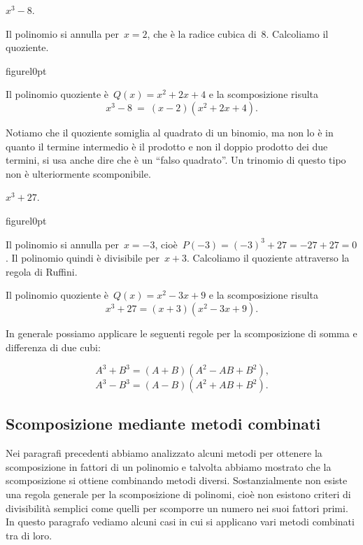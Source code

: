 \begin{exrig}
 \begin{esempio}
 $x^{3}-8$.
\end{esempio}
Il polinomio si annulla per~$x=2$, che è la radice cubica di~8.
Calcoliamo il quoziente.
\begin{wrapfloat}{figure}{l}{0pt}
 
\end{wrapfloat}
Il polinomio quoziente è~$Q(x)=x^{2}+2x+4$ e la scomposizione risulta
\[x^{3}-8\ =\ (x-2)(x^{2}+2x+4).\]

Notiamo che il quoziente somiglia al quadrato di un binomio, ma non lo
è in quanto il termine intermedio è il prodotto e non il doppio
prodotto dei due termini, si usa anche dire che è un ``falso quadrato''.
Un trinomio di questo tipo non è ulteriormente scomponibile.


 \begin{esempio}
 $x^{3}+27$.
 \end{esempio}
 \begin{wrapfloat}{figure}{l}{0pt}
 
\end{wrapfloat}
Il polinomio si annulla per~$x=-3$, cioè~$P(-3)=(-3)^{3}+27=-27+27=0$.
Il polinomio quindi è divisibile per~$x+3$. Calcoliamo il quoziente
attraverso la regola di Ruffini.

Il polinomio quoziente è~$Q(x)=x^{2}-3x+9$ e la scomposizione risulta
\[x^{3}+27=(x+3)(x^{2}-3x+9).\]

\end{exrig}

In generale possiamo applicare le seguenti regole per la scomposizione
di somma e differenza di due cubi:

\[A^{3}+B^{3}=(A+B)(A^{2}-AB+B^{2})\text{,}\]
\[A^{3}-B^{3}=(A-B)(A^{2}+AB+B^{2}).\]

\ovalbox{\risolvii \ref{ese:13.72}, \ref{ese:13.73}, \ref{ese:13.74}}

\subsection{Scomposizione mediante metodi combinati}

Nei paragrafi precedenti abbiamo analizzato alcuni metodi per ottenere
la scomposizione in fattori di un polinomio e talvolta abbiamo mostrato
che la scomposizione si ottiene combinando metodi diversi.
Sostanzialmente non esiste una regola generale per la scomposizione di
polinomi, cioè non esistono criteri di divisibilità semplici come
quelli per scomporre un numero nei suoi fattori primi. In questo
paragrafo vediamo alcuni casi in cui si applicano vari metodi combinati
tra di loro.

